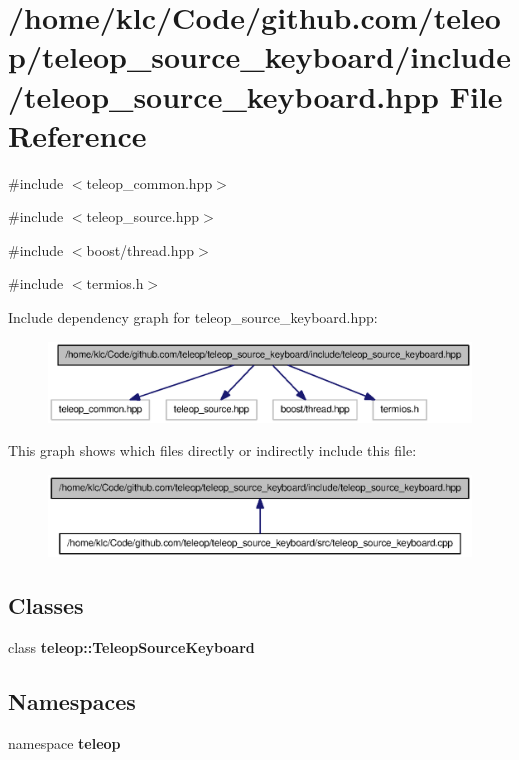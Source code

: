 \section{/home/klc/Code/github.com/teleop/teleop\_\-source\_\-keyboard/include/teleop\_\-source\_\-keyboard.hpp File Reference}
\label{teleop__source__keyboard_8hpp}
{\ttfamily \#include $<$teleop\_\-common.hpp$>$}\par
{\ttfamily \#include $<$teleop\_\-source.hpp$>$}\par
{\ttfamily \#include $<$boost/thread.hpp$>$}\par
{\ttfamily \#include $<$termios.h$>$}\par
Include dependency graph for teleop\_\-source\_\-keyboard.hpp:
\nopagebreak
\begin{figure}[H]
\begin{center}
\leavevmode
\includegraphics[width=400pt]{teleop__source__keyboard_8hpp__incl}
\end{center}
\end{figure}
This graph shows which files directly or indirectly include this file:
\nopagebreak
\begin{figure}[H]
\begin{center}
\leavevmode
\includegraphics[width=400pt]{teleop__source__keyboard_8hpp__dep__incl}
\end{center}
\end{figure}
\subsection*{Classes}
\begin{DoxyCompactItemize}
\item 
class {\bf teleop::TeleopSourceKeyboard}
\end{DoxyCompactItemize}
\subsection*{Namespaces}
\begin{DoxyCompactItemize}
\item 
namespace {\bf teleop}
\end{DoxyCompactItemize}

